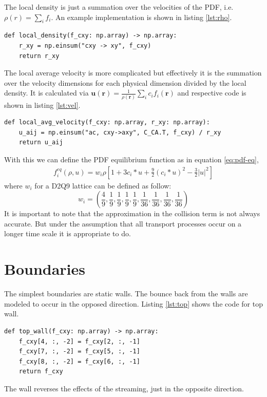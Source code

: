 \documentclass[a4paper,11pt, oneside]{book}
\begin{document}
The local density is just a summation over the velocities of the PDF, i.e. $\rho(r) = \sum_{i} f_{i}$.
An example implementation is shown in listing \ref{lst:rho}.
\begin{center}
\begin{lstlisting}[caption=Implementation of the local density,label=lst:rho, basicstyle=\small]
def local_density(f_cxy: np.array) -> np.array:
    r_xy = np.einsum("cxy -> xy", f_cxy)
    return r_xy
  \end{lstlisting}
\end{center}
The local average velocity is more complicated but effectively it is the summation over the velocity dimensions for each physical dimension divided by the local density.
It is calculated via $\textbf{u}(\textbf{r})=\frac{1}{\rho (\textbf{r})} \sum_{i} c_{i}f_{i}(\textbf{r})$ and respective code is shown in listing \ref{lst:vel}.
\begin{center}
  \begin{lstlisting}[caption=Implementation of the local average velocity.,label=lst:vel, basicstyle=\small]
def local_avg_velocity(f_cxy: np.array, r_xy: np.array):
    u_aij = np.einsum("ac, cxy->axy", C_CA.T, f_cxy) / r_xy
    return u_aij
  \end{lstlisting}
\end{center}
With this we can define the PDF equilibrium function as in equation \ref{eq:pdf-eq},
\begin{equation}
  \label{eq:pdf-eq}
  \begin{aligned}
    f_{i}^{eq} ( \rho , u ) = w_i \rho \left[ 1+3 c_i * u + \frac{9}{2}(c_i * u )^2 - \frac{3}{2} | u |^2 \right]
  \end{aligned}
\end{equation}
where $w_i$ for a D2Q9 lattice can be defined as follow: 
\begin{equation}
w_i = \left( \frac{4}{9}, \frac{1}{9}, \frac{1}{9}, \frac{1}{9}, \frac{1}{9}, \frac{1}{36}, \frac{1}{36}, \frac{1}{36}, \frac{1}{36} \right)
\end{equation}
It is important to note that the approximation in the collision term is not always accurate.
But under the assumption that all transport processes occur on a longer time scale it is appropriate to do.

\section{Boundaries}
The simplest boundaries are static walls. 
The bounce back from the walls are modeled to occur in the opposed direction. 
Listing \ref{lst:top} shows the code for top wall.
\begin{center}
  \begin{lstlisting}[caption=Bounce back at the top wall.,label=lst:top, basicstyle=\small]
def top_wall(f_cxy: np.array) -> np.array:
    f_cxy[4, :, -2] = f_cxy[2, :, -1]
    f_cxy[7, :, -2] = f_cxy[5, :, -1]
    f_cxy[8, :, -2] = f_cxy[6, :, -1]
    return f_cxy
  \end{lstlisting}
\end{center}
The wall reverses the effects of the streaming, just in the opposite direction.
\end{document}
